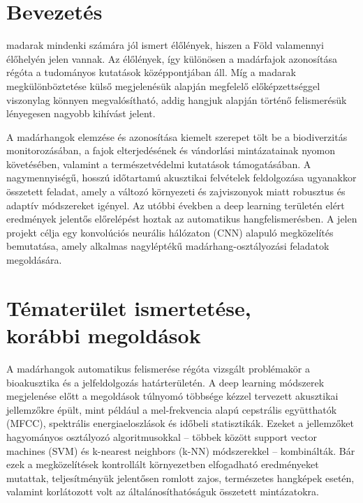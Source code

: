 \documentclass[journal]{IEEEtran}
\begin{document}

\section{Bevezetés}
  
   madarak mindenki számára jól ismert élőlények, hiszen a Föld valamennyi élőhelyén jelen vannak. Az élőlények, így különösen a madárfajok azonosítása régóta a tudományos kutatások középpontjában áll. Míg a madarak megkülönböztetése külső megjelenésük alapján megfelelő előképzettséggel viszonylag könnyen megvalósítható, addig hangjuk alapján történő felismerésük lényegesen nagyobb kihívást jelent.
  
  A madárhangok elemzése és azonosítása kiemelt szerepet tölt be a biodiverzitás monitorozásában, a fajok elterjedésének és vándorlási mintázatainak nyomon követésében, valamint a természetvédelmi kutatások támogatásában. A nagymennyiségű, hosszú időtartamú akusztikai felvételek feldolgozása ugyanakkor összetett feladat, amely a változó környezeti és zajviszonyok miatt robusztus és adaptív módszereket igényel. Az utóbbi években a deep learning területén elért eredmények jelentős előrelépést hoztak az automatikus hangfelismerésben. A jelen projekt célja egy konvolúciós neurális hálózaton (CNN) alapuló megközelítés bemutatása, amely alkalmas nagyléptékű madárhang-osztályozási feladatok megoldására.

\section{Tématerület ismertetése,\\korábbi megoldások}
  
  A madárhangok automatikus felismerése régóta vizsgált problémakör a bioakusztika és a jelfeldolgozás határterületén. A deep learning módszerek megjelenése előtt a megoldások túlnyomó többsége kézzel tervezett akusztikai jellemzőkre épült, mint például a mel-frekvencia alapú cepstrális együtthatók (MFCC), spektrális energiaeloszlások és időbeli statisztikák. Ezeket a jellemzőket hagyományos osztályozó algoritmusokkal -- többek között support vector machines (SVM) és k-nearest neighbors (k-NN) módszerekkel -- kombinálták.  Bár ezek a megközelítések kontrollált környezetben elfogadható eredményeket mutattak, teljesítményük jelentősen romlott zajos, természetes hangképek esetén, valamint korlátozott volt az általánosíthatóságuk összetett mintázatokra. \cite{nilanjana2021}
\end{document}
